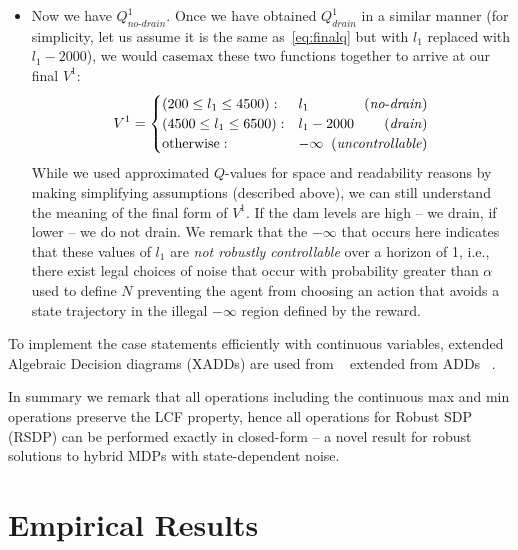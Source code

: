 \documentclass[letterpaper]{article}
\newcommand{\casemax}{\mathrm{casemax}}
\begin{document}
\begin{itemize}
\item Now we have $Q^1_{\mathit{no}\text{-}\mathit{drain}}$.  Once we
  have obtained $Q^1_{\mathit{drain}}$ in a similar manner (for simplicity,
  let us assume it is the same as~\eqref{eq:finalq} but with $l_1$
  replaced with $l_1-2000$), we would $\casemax$ these two functions
  together to arrive at our final $V^1$:
\begin{align}
V^1 =  
\begin{cases}
(200 \leq l_1 \leq 4500): & l_1 \;\; \hfill (\mathit{no}\text{-}\mathit{drain}) \\
(4500 \leq l_1 \leq 6500): & l_1-2000 \;\; \hfill (\mathit{drain}) \\
\text{otherwise} : & -\infty \;\; \hfill (\mathit{uncontrollable}) \\ 
\end{cases} \nonumber
\end{align}
While we used approximated $Q$-values for space and readability reasons
by making simplifying assumptions (described above), we can still understand
the meaning of the final form of $V^1$.  If the dam levels are high -- we drain,
if lower -- we do not drain.
We remark that the $-\infty$ that occurs here indicates that these 
values of $l_1$ are \emph{not robustly controllable} over a horizon of 1,
i.e., there exist legal choices of noise that occur with probability
greater than $\alpha$ used to define $N$ preventing the agent from
choosing an action that avoids a state trajectory in the illegal
$-\infty$ region defined by the reward.
\end{itemize}

To implement the case statements efficiently with continuous
variables, extended Algebraic Decision diagrams (XADDs) are used from
~\cite{sanner_uai11} extended from ADDs
~\cite{bahar93add}. 

In summary we remark that all operations including the
continuous max and min operations preserve the LCF property,
hence all operations for Robust SDP (RSDP) can be performed exactly in
closed-form -- a novel result for robust solutions to hybrid MDPs
with state-dependent noise.

\section{Empirical Results}
\end{document}

